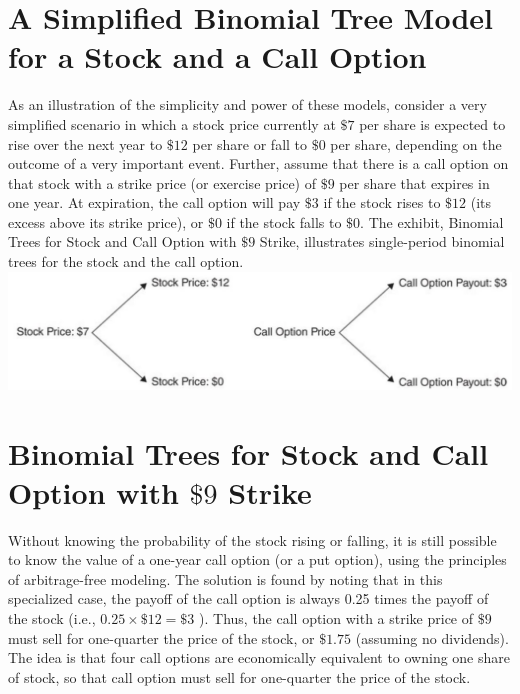 \documentclass[11pt]{article}
\begin{document}
\section*{A Simplified Binomial Tree Model for a Stock and a Call Option}
As an illustration of the simplicity and power of these models, consider a very simplified scenario in which a stock price currently at $\$ 7$ per share is expected to rise over the next year to $\$ 12$ per share or fall to $\$ 0$ per share, depending on the outcome of a very important event. Further, assume that there is a call option on that stock with a strike price (or exercise price) of $\$ 9$ per share that expires in one year. At expiration, the call option will pay $\$ 3$ if the stock rises to $\$ 12$ (its excess above its strike price), or $\$ 0$ if the stock falls to $\$ 0$. The exhibit, Binomial Trees for Stock and Call Option with $\$ 9$ Strike, illustrates single-period binomial trees for the stock and the call option.\\
\includegraphics[max width=\textwidth, center]{2024_04_10_859893730bbb41b27826g-2(1)}

\section*{Binomial Trees for Stock and Call Option with $\$ 9$ Strike}
Without knowing the probability of the stock rising or falling, it is still possible to know the value of a one-year call option (or a put option), using the principles of arbitrage-free modeling. The solution is found by noting that in this specialized case, the payoff of the call option is always 0.25 times the payoff of the stock (i.e., $0.25 \times \$ 12=\$ 3$ ). Thus, the call option with a strike price of $\$ 9$ must sell for one-quarter the price of the stock, or $\$ 1.75$ (assuming no dividends). The idea is that four call options are economically equivalent to owning one share of stock, so that call option must sell for one-quarter the price of the stock.
\end{document}
